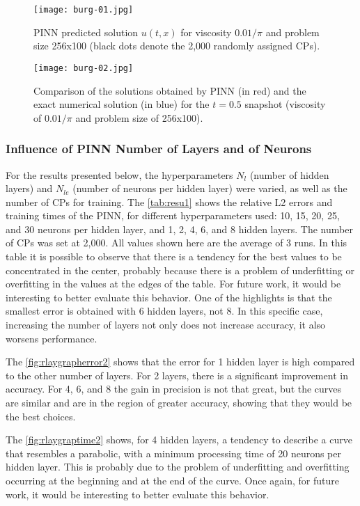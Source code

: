 \documentclass[conference]{IEEEtran}
\begin{document}
\begin{figure}[htb]\centering
\texttt{[image: burg-01.jpg]}
\caption{PINN predicted solution $u(t, x)$ for viscosity ${0.01}/{\pi}$ and problem size 256x100 (black dots denote the 2,000 randomly assigned CPs).} 
\label{fig:bur1}
\end{figure}

\begin{figure}[htb]\centering
\texttt{[image: burg-02.jpg]}
\caption{Comparison of the solutions obtained by PINN (in red) and the exact numerical solution (in blue) for the $t=0.5$ snapshot (viscosity of ${0.01}/{\pi}$ and problem size of 256x100).}
\label{fig:bur2}
\end{figure}

\subsubsection{Influence of PINN Number of Layers and of Neurons}

For the results presented below, the hyperparameters $N_{l}$ (number of hidden layers) and $N_{le}$ (number of neurons per hidden layer) were varied, as well as the number of CPs for training.
The \autoref{tab:resu1} shows the relative L2 errors and training times of the PINN, for different hyperparameters used: 10, 15, 20, 25, and 30 neurons per hidden layer, and 1, 2, 4, 6, and 8 hidden layers.
The number of CPs was set at 2,000.
All values shown here are the average of 3 runs.
In this table it is possible to observe that there is a tendency for the best values to be concentrated in the center, probably because there is a problem of underfitting or overfitting in the values at the edges of the table. For future work, it would be interesting to better evaluate this behavior. One of the highlights is that the smallest error is obtained with 6 hidden layers, not 8. In this specific case, increasing the number of layers not only does not increase accuracy, it also worsens performance.

The \autoref{fig:rlaygrapherror2} shows that the error for 1 hidden layer is high compared to the other number of layers. For 2 layers, there is a significant improvement in accuracy. For 4, 6, and 8 the gain in precision is not that great, but the curves are similar and are in the region of greater accuracy, showing that they would be the best choices.

The \autoref{fig:rlaygraptime2} shows, for 4 hidden layers, a tendency to describe a curve that resembles a parabolic, with a minimum processing time of 20 neurons per hidden layer. This is probably due to the problem of underfitting and overfitting occurring at the beginning and at the end of the curve. Once again, for future work, it would be interesting to better evaluate this behavior.
\end{document}
